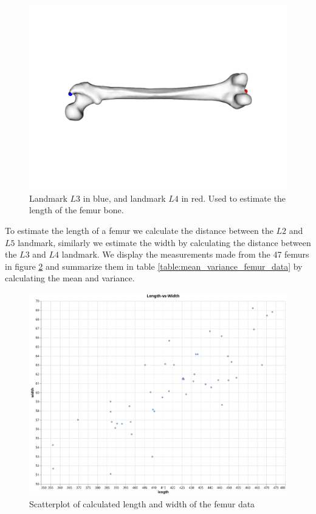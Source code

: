 \documentclass[10pt]{article}
\theoremstyle{definition}
\begin{document}
\begin{figure}[h]
\centering
\includegraphics[scale=0.2]{screenshots/width_L2blue_L5red.png}
\caption{Landmark $L3$ in blue, and landmark $L4$ in red. Used to estimate the length of the femur bone.}
\label{fig:landmark_length}
\end{figure}
\noindent
To estimate the length of a femur we calculate the distance between the $L2$ and $L5$ landmark, similarly we estimate the width by calculating the distance between the $L3$ and $L4$ landmark. We display the measurements made from the 47 femurs in figure \ref{fig:scatterplot_femurdata} and summarize them in table \ref{table:mean_variance_femur_data} by calculating the mean and variance.
\begin{figure}
\centering
\includegraphics[scale=0.35]{screenshots/data_scatterplot.png}
\caption{Scatterplot of calculated length and width of the femur data}
\label{fig:scatterplot_femurdata}
\end{figure}
\end{document}
